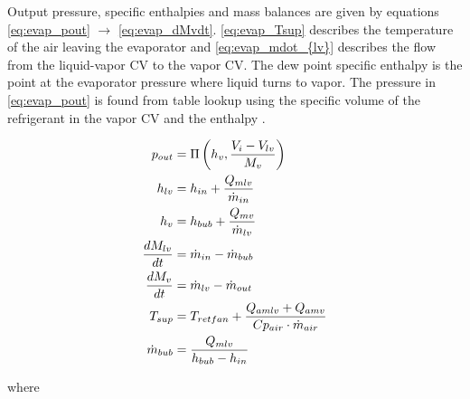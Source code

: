\medskip
Output pressure, specific enthalpies and mass balances are given by equations \cref{eq:evap_pout} $\rightarrow$ \cref{eq:evap_dMvdt}. \cref{eq:evap_Tsup} describes the temperature of the air leaving the evaporator and \cref{eq:evap_mdot_{lv}} describes the flow from the liquid-vapor CV to the vapor CV. The dew point specific enthalpy is the point at the evaporator pressure where liquid turns to vapor. The pressure in \cref{eq:evap_pout} is found from table lookup using the specific volume of the refrigerant in the vapor CV and the enthalpy .

\begin{align}
	p_{out}         & = \Pi \left( h_v, \frac{V_i-V_{lv}}{M_v} \right)		\label{eq:evap_pout}                       \\
	h_{lv}             & = h_{in} + \frac{Q_{mlv}}{\dot{m}_{in}}                                                       \\
	h_v             & = h_{bub} + \frac{Q_{mv}}{\dot{m}_{lv}}                                                       \\
	\frac{dM_{lv}}{dt} & = \dot{m}_{in} - \dot{m}_{bub}                                                                \\
	\frac{dM_v}{dt} & = \dot{m}_{lv} - \dot{m}_{out}                   \label{eq:evap_dMvdt}                       \\
	T_{sup}         & = T_{retfan} +  \frac{Q_{amlv} + Q_{amv}}{Cp_{air} \cdot \dot{m}_{air}} \label{eq:evap_Tsup} \\
	\dot{m}_{bub}    & = \frac{Q_{mlv}}{h_{bub} - h_{in}} \label{eq:evap_mdot_{lv}}
\end{align}



where\\


